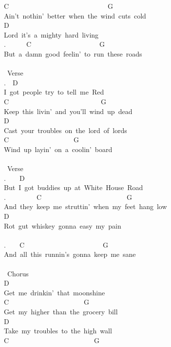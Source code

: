 {C\ \ \ \ \ \ \ \ \ \ \ \ \ \ \ \ \ \ \ \ \ \ \ \ \ \ \ \ \ G\\
Ain't\ nothin'\ better\ when\ the\ wind\ cuts\ cold\\
D\\
Lord\ it's\ a\ mighty\ hard\ living\ \\
.\ \ \ \ \ \ C\ \ \ \ \ \ \ \ \ \ \ \ \ \ \ \ \ \ \ \ G\\
But\ a\ damn\ good\ feelin'\ to\ run\ these\ roads\\
\\
\lbrack\ Verse\rbrack\\
.\ \ D\\
I\ got\ people\ try\ to\ tell\ me\ Red\\
C\ \ \ \ \ \ \ \ \ \ \ \ \ \ \ \ \ \ \ \ \ \ \ \ \ \ \ G\\
Keep\ this\ livin'\ and\ you'll\ wind\ up\ dead\\
D\\
Cast\ your\ troubles\ on\ the\ lord\ of\ lords\\
C\ \ \ \ \ \ \ \ \ \ \ \ \ \ \ \ \ \ \ G\\
Wind\ up\ layin'\ on\ a\ coolin'\ board\\
\\
\lbrack\ Verse\rbrack\\
.\ \ \ \ D\\
But\ I\ got\ buddies\ up\ at\ White\ House\ Road\\
.\ \ \ \ \ \ \ \ \ C\ \ \ \ \ \ \ \ \ \ \ \ \ \ \ \ \ \ \ \ \ \ \ \ \ G\\
And\ they\ keep\ me\ struttin'\ when\ my\ feet\ hang\ low\\
D\\
Rot\ gut\ whiskey\ gonna\ easy\ my\ pain\\
\\
.\ \ \ \ C\ \ \ \ \ \ \ \ \ \ \ \ \ \ \ \ \ \ \ \ \ \ \ G\\
And\ all\ this\ runnin's\ gonna\ keep\ me\ sane\\
\\
\lbrack\ Chorus\rbrack\\
D\\
Get\ me\ drinkin'\ that\ moonshine\\
C\ \ \ \ \ \ \ \ \ \ \ \ \ \ \ \ \ \ \ \ \ \ G\\
Get\ my\ higher\ than\ the\ grocery\ bill\\
D\\
Take\ my\ troubles\ to\ the\ high\ wall\\
C\ \ \ \ \ \ \ \ \ \ \ \ \ \ \ \ \ \ \ \ \ \ \ \ \ G\\
}
